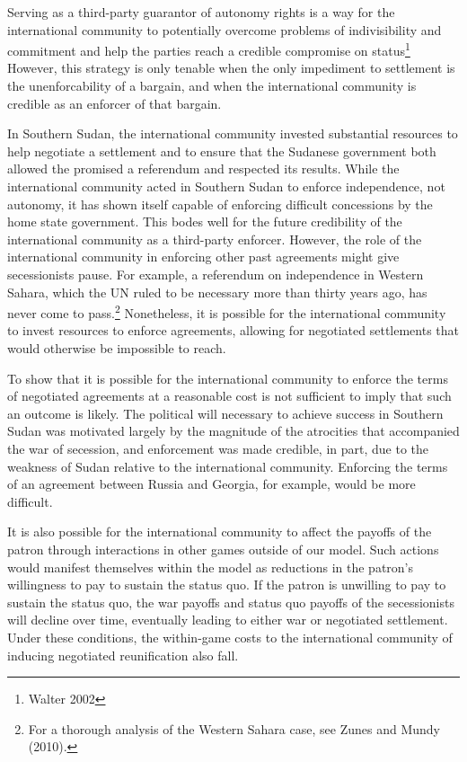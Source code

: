 \documentclass[12pt,letterpaper, notitlepage]{article}
\begin{document}
Serving as a third-party guarantor of autonomy rights is a way for the international community to potentially overcome problems of indivisibility and commitment and help the parties reach a credible compromise on status\footnote{Walter 2002} However, this strategy is only tenable when the only impediment to settlement is the unenforcability of a bargain, and when the international community is credible as an enforcer of that bargain.


In Southern Sudan, the international community invested substantial resources to help negotiate a settlement and to ensure that the Sudanese government both allowed the promised a referendum and respected its results. While the international community acted in Southern Sudan to enforce independence, not autonomy, it has shown itself capable of enforcing difficult concessions by the home state government. This bodes well for the future credibility of the international community as a third-party enforcer.  However, the role of the international community in enforcing other past agreements might give secessionists pause. For example, a referendum on independence in Western Sahara, which the UN ruled to be necessary more than thirty years ago, has never come to pass.\footnote{For a thorough analysis of the Western Sahara case, see Zunes and Mundy (2010).}  Nonetheless, it is possible for the international community to invest resources to enforce agreements, allowing for negotiated settlements that would otherwise be impossible to reach.

To show that it is possible for the international community to enforce the terms of negotiated agreements at a reasonable cost is not sufficient to imply that such an outcome is likely. The political will necessary to achieve success in Southern Sudan was motivated largely by the magnitude of the atrocities that accompanied the war of secession, and enforcement was made credible, in part, due to the weakness of Sudan relative to the international community. Enforcing the terms of an agreement between Russia and Georgia, for example, would be more difficult.

It is also possible for the international community to affect the payoffs of the patron through interactions in other games outside of our model. Such actions would manifest themselves within the model as reductions in the patron's willingness to pay to sustain the status quo. If the patron is unwilling to pay to sustain the status quo, the war payoffs and status quo payoffs of the secessionists will decline over time, eventually leading to either war or negotiated settlement. Under these conditions, the within-game costs to the international community of inducing negotiated reunification also fall.
\end{document}
